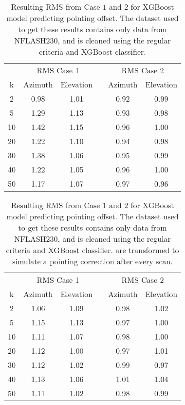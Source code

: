 \begin{table}[h]
    \centering %
    \caption{Resulting RMS from Case $1$ and $2$ for XGBoost model predicting pointing offset.
    The dataset used to get these results contains only data from NFLASH230, and is cleaned using the regular criteria and XGBoost classifier.}
    \begin{tabular}{ccc c cc}
        \toprule
        \multicolumn{1}{c}{} & \multicolumn{2}{c}{RMS Case 1} & & \multicolumn{2}{c}{RMS Case 2} \\
        \cmidrule(lr){2-3} \cmidrule(lr){5-6}
        k & Azimuth & Elevation & & Azimuth & Elevation \\
        \midrule
         2 &  0.98 & 1.01 & & 0.92 &  0.99 \\
         5 &  1.29 & 1.13 & & 0.93 &  0.98 \\
        10 &  1.42 & 1.15 & & 0.96 &  1.00 \\
        20 &  1.22 & 1.10 & & 0.94 &  0.98 \\
        30 &  1.38 & 1.06 & & 0.95 &  0.99 \\
        40 &  1.22 & 1.05 & & 0.96 &  1.00 \\
        50 &  1.17 & 1.07 & & 0.97 &  0.96 \\
        \bottomrule
    \end{tabular}
\end{table}


\begin{table}[h]
    \centering %
    \caption{Resulting RMS from Case $1$ and $2$ for XGBoost model predicting pointing offset.
    The dataset used to get these results contains only data from NFLASH230, and is cleaned using the regular criteria and XGBoost classifier.
    are transformed to simulate a pointing correction after every scan.}
    \begin{tabular}{ccc c cc}
        \toprule
        \multicolumn{1}{c}{} & \multicolumn{2}{c}{RMS Case 1} & & \multicolumn{2}{c}{RMS Case 2} \\
        \cmidrule(lr){2-3} \cmidrule(lr){5-6}
        k & Azimuth & Elevation & & Azimuth & Elevation \\
        \midrule
         2 &  1.06 & 1.09 & & 0.98 &  1.02 \\
         5 &  1.15 & 1.13 & & 0.97 &  1.00 \\
        10 &  1.11 & 1.07 & & 0.98 &  1.00 \\
        20 &  1.12 & 1.00 & & 0.97 &  1.01 \\
        30 &  1.12 & 1.02 & & 0.99 &  0.97 \\
        40 &  1.13 & 1.06 & & 1.01 &  1.04 \\
        50 &  1.11 & 1.02 & & 0.98 &  0.99 \\
        \bottomrule
    \end{tabular}
\end{table}

